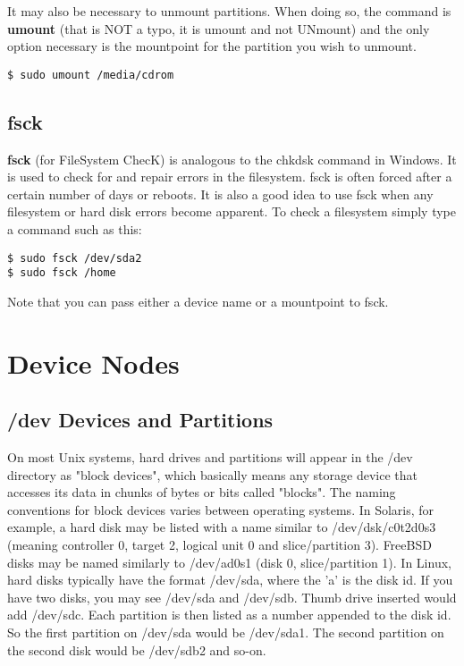It may also be necessary to unmount partitions.  When doing so, the command is \textbf{umount} (that is NOT a typo, it is umount and not UNmount) and the only option necessary is the mountpoint for the partition you wish to unmount.

\begin{verbatim}
$ sudo umount /media/cdrom
\end{verbatim}

\subsection{fsck}

\textbf{fsck} (for FileSystem ChecK) is analogous to the chkdsk command in Windows.  It is used to check for and repair errors in the filesystem.  fsck is often forced after a certain number of days or reboots.  It is also a good idea to use fsck when any filesystem or hard disk errors become apparent.  To check a filesystem simply type a command such as this:

\begin{verbatim}
$ sudo fsck /dev/sda2
$ sudo fsck /home
\end{verbatim}

Note that you can pass either a device name or a mountpoint to fsck.  

\section{Device Nodes}

\subsection{/dev Devices and Partitions}

On most Unix systems, hard drives and partitions will appear in the /dev directory as "block devices", which basically means any storage device that accesses its data in chunks of bytes or bits called "blocks".  The naming conventions for block devices varies between operating systems.  In Solaris, for example, a hard disk may be listed with a name similar to /dev/dsk/c0t2d0s3 (meaning controller 0, target 2, logical unit 0 and slice/partition 3).  FreeBSD disks may be named similarly to /dev/ad0s1 (disk 0, slice/partition 1).  In Linux, hard disks typically have the format /dev/sda, where the 'a' is the disk id.  If you have two disks, you may see /dev/sda and /dev/sdb.   Thumb drive inserted would add /dev/sdc.  Each partition is then listed as a number appended to the disk id.  So the first partition on /dev/sda would be /dev/sda1.  The second partition on the second disk would be /dev/sdb2 and so-on.\\

